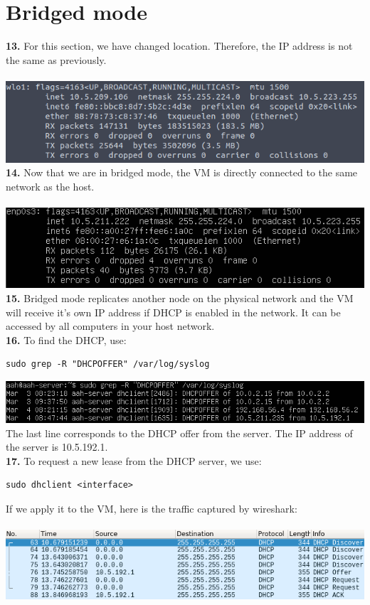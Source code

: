 \documentclass[12pt]{extarticle}
\begin{document}
\section{Bridged mode}
\textbf{13.} For this section, we have changed location. Therefore, the IP address is not the same as previously.\\~\\
\includegraphics[scale=0.6]{resources/13.png}\\

\textbf{14.} Now that we are in bridged mode, the VM is directly connected to the same network as the host.\\~\\
\includegraphics[scale=0.7]{resources/14.png}\\

\textbf{15.} Bridged mode replicates another node on the physical network and the VM will receive it's own IP address if DHCP is enabled in the network. It can be accessed by all computers in your host network.\\

\textbf{16.} To find the DHCP, use:
\begin{verbatim}
sudo grep -R "DHCPOFFER" /var/log/syslog
\end{verbatim}
\includegraphics[scale=0.6]{resources/15.png}\\
The last line corresponds to the DHCP offer from the server. The IP address of the server is 10.5.192.1.\\

\textbf{17.} To request a new lease from the DHCP server, we use:
\begin{verbatim}
sudo dhclient <interface>
\end{verbatim}
If we apply it to the VM, here is the traffic captured by wireshark:\\~\\
\includegraphics[scale=0.6]{resources/16.png}\\
\end{document}
